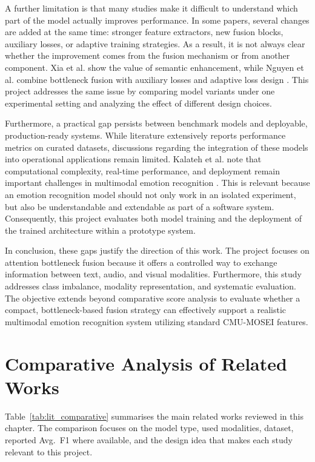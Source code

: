 A further limitation is that many studies make it difficult to understand which part of the model actually improves performance. In some papers, several changes are added at the same time: stronger feature extractors, new fusion blocks, auxiliary losses, or adaptive training strategies. As a result, it is not always clear whether the improvement comes from the fusion mechanism or from another component. Xia et al. show the value of semantic enhancement, while Nguyen et al. combine bottleneck fusion with auxiliary losses and adaptive loss design \cite{xia2022multimodal,nguyen2025enhanced}. This project addresses the same issue by comparing model variants under one experimental setting and analyzing the effect of different design choices.

Furthermore, a practical gap persists between benchmark models and deployable, production-ready systems. While literature extensively reports performance metrics on curated datasets, discussions regarding the integration of these models into operational applications remain limited. Kalateh et al. note that computational complexity, real-time performance, and deployment remain important challenges in multimodal emotion recognition \cite{kalateh2024systematic}. This is relevant because an emotion recognition model should not only work in an isolated experiment, but also be understandable and extendable as part of a software system. Consequently, this project evaluates both model training and the deployment of the trained architecture within a prototype system.

In conclusion, these gaps justify the direction of this work. The project focuses on attention bottleneck fusion because it offers a controlled way to exchange information between text, audio, and visual modalities. Furthermore, this study addresses class imbalance, modality representation, and systematic evaluation. The objective extends beyond comparative score analysis to evaluate whether a compact, bottleneck-based fusion strategy can effectively support a realistic multimodal emotion recognition system utilizing standard CMU-MOSEI features.

\section{Comparative Analysis of Related Works}

Table~\ref{tab:lit_comparative} summarises the main related works reviewed in this chapter. The comparison focuses on the model type, used modalities, dataset, reported Avg.~F1 where available, and the design idea that makes each study relevant to this project.

